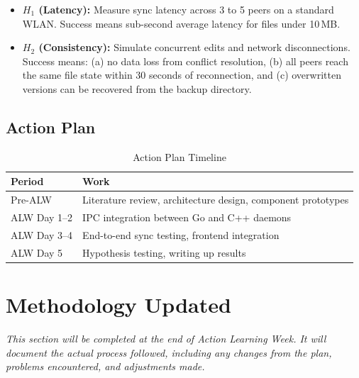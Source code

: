 \begin{itemize}
    \item \textbf{$H_1$ (Latency):} Measure sync latency across 3 to 5 peers on a standard WLAN. Success means sub-second average latency for files under 10\,MB.

    \item \textbf{$H_2$ (Consistency):} Simulate concurrent edits and network disconnections. Success means: (a) no data loss from conflict resolution, (b) all peers reach the same file state within 30 seconds of reconnection, and (c) overwritten versions can be recovered from the backup directory.
\end{itemize}

\subsection{Action Plan}

\begin{table}[htbp]
\centering
\caption{Action Plan Timeline}
\label{tab:action-plan}
\begin{tabular}{p{3cm} p{10cm}}
\toprule
\textbf{Period} & \textbf{Work} \\
\midrule
Pre-ALW & Literature review, architecture design, component prototypes \\
\midrule
ALW Day 1--2 & IPC integration between Go and C++ daemons \\
\midrule
ALW Day 3--4 & End-to-end sync testing, frontend integration \\
\midrule
ALW Day 5 & Hypothesis testing, writing up results \\
\bottomrule
\end{tabular}
\end{table}

\section{Methodology Updated}
\label{sec:method-updated}

\textit{This section will be completed at the end of Action Learning Week. It will document the actual process followed, including any changes from the plan, problems encountered, and adjustments made.}
